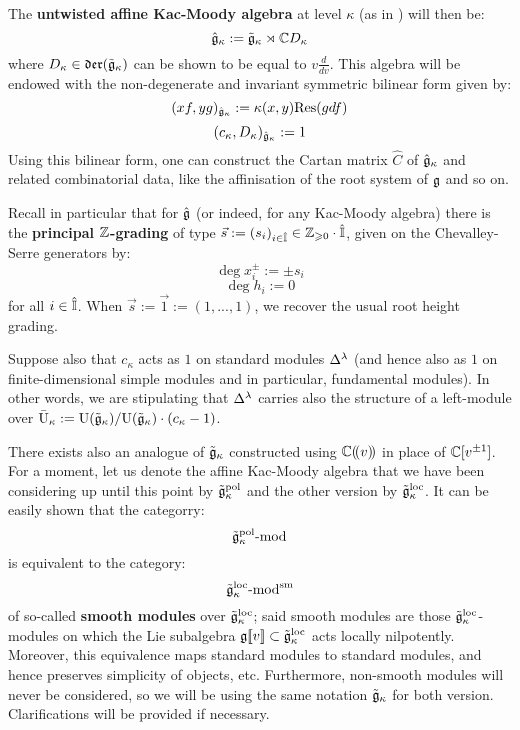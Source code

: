             The \textbf{untwisted affine Kac-Moody algebra} at level $\kappa$ (as in \cite[Chapter 7]{kac_infinite_dimensional_lie_algebras}) will then be:
                $$\hat{\mathfrak{g}}_{\kappa} := \tilde{\mathfrak{g}}_{\kappa} \rtimes \mathbb{C} D_{\kappa}$$
            where $D_{\kappa} \in \mathfrak{der}(\tilde{\mathfrak{g}}_{\kappa})$ can be shown to be equal to $v\frac{d}{dv}$. This algebra will be endowed with the non-degenerate and invariant symmetric bilinear form given by:
                $$(xf, yg)_{\hat{\mathfrak{g}}_{\kappa}} := \kappa(x, y) \mathrm{Res}(g df)$$
                $$(c_{\kappa}, D_{\kappa})_{\hat{\mathfrak{g}}_{\kappa}} := 1$$
            Using this bilinear form, one can construct the Cartan matrix $\hat{C}$ of $\hat{\mathfrak{g}}_{\kappa}$ and related combinatorial data, like the affinisation of the root system of $\mathfrak{g}$ and so on.
                
            Recall in particular that for $\hat{\mathfrak{g}}$ (or indeed, for any Kac-Moody algebra) there is the \textbf{principal $\mathbb{Z}$-grading} of type $\vec{s} := (s_i)_{i \in \hat{\mathbb{I}}} \in \mathbb{Z}_{\geqslant 0} \cdot \hat{\mathbb{I}}$, given on the Chevalley-Serre generators by:
                $$\deg x_i^{\pm} := \pm s_i$$
                $$\deg h_i := 0$$
            for all $i \in \hat{\mathbb{I}}$. When $\vec{s} := \vec{1} := (1, ..., 1)$, we recover the usual root height grading. 
    
            Suppose also that $c_{\kappa}$ acts as $1$ on standard modules $\Delta^{\lambda}$ (and hence also as $1$ on finite-dimensional simple modules and in particular, fundamental modules). In other words, we are stipulating that $\Delta^{\lambda}$ carries also the structure of a left-module over $\bar{\mathrm{U}}_{\kappa} := \mathrm{U}(\tilde{\mathfrak{g}}_{\kappa})/\mathrm{U}(\tilde{\mathfrak{g}}_{\kappa}) \cdot (c_{\kappa} - 1)$.

            There exists also an analogue of $\tilde{\mathfrak{g}}_{\kappa}$ constructed using $\mathbb{C}(\!(v)\!)$ in place of $\mathbb{C}[v^{\pm 1}]$. For a moment, let us denote the affine Kac-Moody algebra that we have been considering up until this point by $\tilde{\mathfrak{g}}_{\kappa}^{\mathrm{pol}}$ and the other version by $\tilde{\mathfrak{g}}_{\kappa}^{\mathrm{loc}}$. It can be easily shown that the categorry:
                $$\tilde{\mathfrak{g}}_{\kappa}^{\mathrm{pol}}\text{-}\mathrm{mod}$$
            is equivalent to the category:
                $$\tilde{\mathfrak{g}}_{\kappa}^{\mathrm{loc}}\text{-}\mathrm{mod}^{\mathrm{sm}}$$
            of so-called \textbf{smooth modules} over $\tilde{\mathfrak{g}}_{\kappa}^{\mathrm{loc}}$; said smooth modules are those $\tilde{\mathfrak{g}}_{\kappa}^{\mathrm{loc}}$-modules on which the Lie subalgebra $\mathfrak{g}[\![v]\!] \subset \tilde{\mathfrak{g}}_{\kappa}^{\mathrm{loc}}$ acts locally nilpotently. Moreover, this equivalence maps standard modules to standard modules, and hence preserves simplicity of objects, etc. Furthermore, non-smooth modules will never be considered, so we will be using the same notation $\tilde{\mathfrak{g}}_{\kappa}$ for both version. Clarifications will be provided if necessary.

